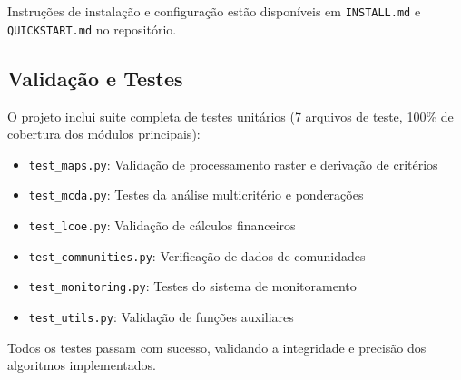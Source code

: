 \documentclass[12pt, a4paper]{article}
\begin{document}
Instruções de instalação e configuração estão disponíveis em \texttt{INSTALL.md} e \texttt{QUICKSTART.md} no repositório.

\subsection{Validação e Testes}

O projeto inclui suite completa de testes unitários (7 arquivos de teste, 100\% de cobertura dos módulos principais):

\begin{itemize}
    \item \texttt{test\_maps.py}: Validação de processamento raster e derivação de critérios
    \item \texttt{test\_mcda.py}: Testes da análise multicritério e ponderações
    \item \texttt{test\_lcoe.py}: Validação de cálculos financeiros
    \item \texttt{test\_communities.py}: Verificação de dados de comunidades
    \item \texttt{test\_monitoring.py}: Testes do sistema de monitoramento
    \item \texttt{test\_utils.py}: Validação de funções auxiliares
\end{itemize}

Todos os testes passam com sucesso, validando a integridade e precisão dos algoritmos implementados.
\end{document}
